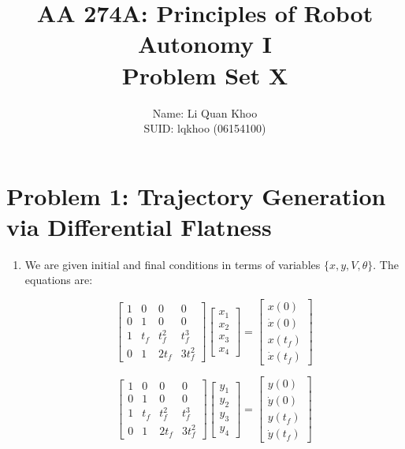 \documentclass{article}
\title{AA 274A: Principles of Robot Autonomy I \\ Problem Set X}
\author{Name: Li Quan Khoo     \\ SUID: lqkhoo (06154100)}
\date{}
\begin{document}
\maketitle
\pagestyle{fancy} 

\section*{Problem 1: Trajectory Generation via Differential Flatness}
\begin{enumerate}[label=(\roman*)]
\item %

We are given initial and final conditions in terms of variables $\{x, y, V, \theta\}$. The equations are:

$$
\begin{bmatrix}
1 & 0   & 0      & 0 \\
0 & 1   & 0      & 0 \\
1 & t_f & t_f^2  & t_f^3 \\
0 & 1   & 2 t_f  & 3 t_f^2
\end{bmatrix}
\begin{bmatrix}
x_1 \\ x_2 \\ x_3 \\ x_4
\end{bmatrix}
=
\begin{bmatrix}
x(0) \\ \dot{x}(0) \\ x(t_f) \\ \dot{x}(t_f)
\end{bmatrix}
$$

$$
\begin{bmatrix}
1 & 0   & 0      & 0 \\
0 & 1   & 0      & 0 \\
1 & t_f & t_f^2  & t_f^3 \\
0 & 1   & 2 t_f  & 3 t_f^2
\end{bmatrix}
\begin{bmatrix}
y_1 \\ y_2 \\ y_3 \\ y_4
\end{bmatrix}
=
\begin{bmatrix}
y(0) \\ \dot{y}(0) \\ y(t_f) \\ \dot{y}(t_f)
\end{bmatrix}
$$


\end{enumerate}
\end{document}
